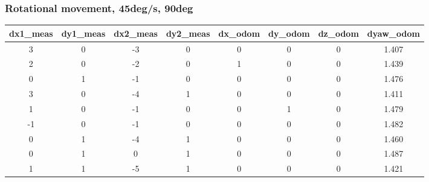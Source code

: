 \documentclass[a4paper, 12pt]{article}
\begin{document}
    \subsubsection{Rotational movement, 45deg/s, 90deg}
    \begin{table}[H]
    \scriptsize
    \begin{tabular}{@{}cccccccc@{}}
    \toprule
    \textbf{dx1\_meas} & \textbf{dy1\_meas} & \textbf{dx2\_meas} & \textbf{dy2\_meas} & \textbf{dx\_odom} & \textbf{dy\_odom} & \textbf{dz\_odom} & \textbf{dyaw\_odom} \\ \midrule
    3                      & 0                      & -3                     & 0                      & 0                 & 0                 & 0                 & 1.407               \\
    2                      & 0                      & -2                     & 0                      & 1                 & 0                 & 0                 & 1.439               \\
    0                      & 1                      & -1                     & 0                      & 0                 & 0                 & 0                 & 1.476               \\
    3                      & 0                      & -4                     & 1                      & 0                 & 0                 & 0                 & 1.411               \\
    1                      & 0                      & -1                     & 0                      & 0                 & 1                 & 0                 & 1.479               \\
    -1                     & 0                      & -1                     & 0                      & 0                 & 0                 & 0                 & 1.482               \\
    0                      & 1                      & -4                     & 1                      & 0                 & 0                 & 0                 & 1.460               \\
    0                      & 1                      & 0                      & 1                      & 0                 & 0                 & 0                 & 1.487               \\
    1                      & 1                      & -5                     & 1                      & 0                 & 0                 & 0                 & 1.421               \\

\end{tabular}
\end{table}
\end{document}
